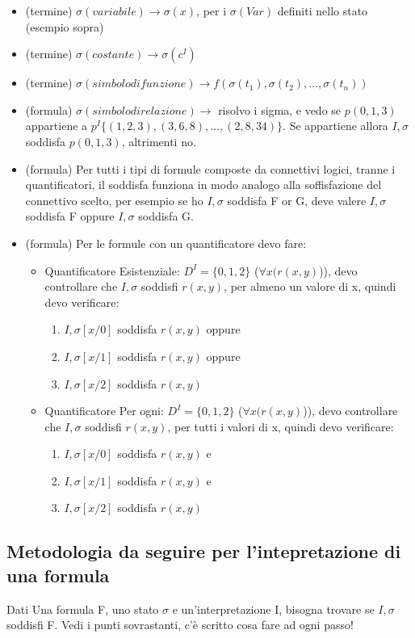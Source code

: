 \documentclass[11pt]{article}
\begin{document}
\begin{itemize}
    \item (termine) $\sigma(variabile) \to \sigma(x)$, per i $\sigma(Var)$ definiti nello stato (esempio sopra)
    \item (termine) $\sigma(costante) \to \sigma(c^{I})$
    \item (termine) $\sigma(simbolo di funzione) \to f(\sigma(t_1),\sigma(t_2), ... ,\sigma(t_n))$
    \item (formula) $\sigma(simbolo di relazione) \to$ risolvo i sigma, e vedo se $p(0,1,3)$ appartiene a $p^{I}\{(1,2,3),(3,6,8), ... ,(2,8,34)\}$. Se 
    appartiene allora $I, \sigma $ soddisfa $p(0,1,3)$, altrimenti no.
    \item (formula) Per tutti i tipi di formule composte da connettivi logici, tranne i quantificatori, il soddisfa funziona in modo analogo alla soffisfazione del connettivo scelto, 
    per esempio se ho $I, \sigma $ soddisfa F or G, deve valere $I, \sigma $ soddisfa F oppure $I, \sigma $ soddisfa G.
    \item (formula) Per le formule con un quantificatore devo fare:
    \begin{itemize}
        \item Quantificatore Esistenziale: $D^{I} = \{0,1,2\}$ ($\forall x (r(x,y)$)), devo controllare che $I, \sigma$ soddisfi 
        $r(x,y)$, per almeno un valore di x, quindi devo verificare:
        \begin{enumerate}
            \item $I, \sigma[x/0]$ soddisfa $r(x,y)$ oppure
            \item $I, \sigma[x/1]$ soddisfa $r(x,y)$ oppure
            \item $I, \sigma[x/2]$ soddisfa $r(x,y)$
        \end{enumerate}
        \item Quantificatore Per ogni: $D^{I} = \{0,1,2\}$ ($\forall x (r(x,y)$)), devo controllare che $I, \sigma$ soddisfi 
        $r(x,y)$, per tutti i valori di x, quindi devo verificare:
        \begin{enumerate}
            \item $I, \sigma[x/0]$ soddisfa $r(x,y)$ e
            \item $I, \sigma[x/1]$ soddisfa $r(x,y)$ e
            \item $I, \sigma[x/2]$ soddisfa $r(x,y)$
        \end{enumerate}
    \end{itemize}
\end{itemize}
\subsection{Metodologia da seguire per l'intepretazione di una formula}
Dati Una formula F, uno stato $\sigma$ e un'interpretazione I, bisogna trovare se $I, \sigma$ soddisfi F. Vedi i punti sovrastanti, 
c'è scritto cosa fare ad ogni passo!
\end{document}
